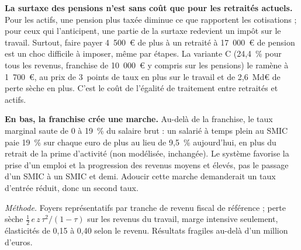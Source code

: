 \documentclass[11pt,a4paper]{article}
\begin{document}
\textbf{La surtaxe des pensions n'est sans coût que pour les retraités actuels.} Pour les actifs, une
pension plus taxée diminue ce que rapportent les cotisations ; pour ceux qui l'anticipent, une partie de
la surtaxe redevient un impôt sur le travail. Surtout, faire payer 4~500~€ de plus à un retraité à
17~000~€ de pension est un choc difficile à imposer, même par étapes. La variante C (24,4~\% pour
tous les revenus, franchise de 10~000~€ y compris sur les pensions) le ramène à 1~700~€, au prix de
3~points de taux en plus sur le travail et de 2,6~Md€ de perte sèche en plus. C'est le coût de
l'égalité de traitement entre retraités et actifs.

\textbf{En bas, la franchise crée une marche.} Au-delà de la franchise, le taux marginal saute de 0 à 19~\% du
salaire brut : un salarié à temps plein au SMIC paie 19~\% sur chaque euro de plus au lieu de 9,5~\%
aujourd'hui, en plus du retrait de la prime d'activité (non modélisée, inchangée). Le système
favorise la prise d'un emploi et la progression des revenus moyens et élevés, pas le passage d'un SMIC à
un SMIC et demi. Adoucir cette marche demanderait un taux d'entrée réduit, donc un second taux.

{\footnotesize\color{encre} \emph{Méthode.} Foyers représentatifs par tranche de revenu fiscal de
référence ; perte sèche $\tfrac12\,e\,z\,\tau^2/(1-\tau)$ sur les revenus du travail, marge intensive
seulement, élasticités de 0,15 à 0,40 selon le revenu. Résultats fragiles au-delà d'un million
d'euros.\par}
\end{document}
